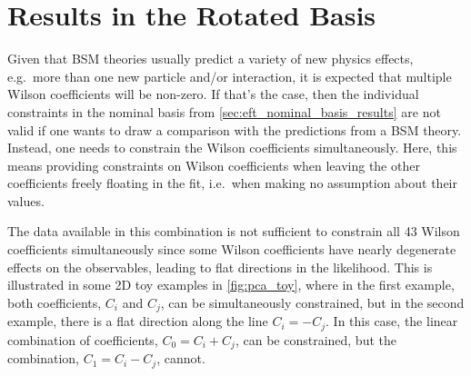 \section{Results in the Rotated Basis}\label{sec:eft_rotated_basis_results}

Given that BSM theories usually predict a variety of new physics effects, e.g.\ more than one new particle and/or interaction, it is expected that multiple Wilson coefficients will be non-zero. If that's the case, then the individual constraints in the nominal basis from \cref{sec:eft_nominal_basis_results} are not valid if one wants to draw a comparison with the predictions from a BSM theory. Instead, one needs to constrain the Wilson coefficients simultaneously. Here, this means providing constraints on Wilson coefficients when leaving the other coefficients freely floating in the fit, i.e.\ when making no assumption about their values. 

The data available in this combination is not sufficient to constrain all 43 Wilson coefficients simultaneously since some Wilson coefficients have nearly degenerate effects on the observables, leading to flat directions in the likelihood. This is illustrated in some 2D toy examples in \cref{fig:pca_toy}, where in the first example, both coefficients, $C_i$ and $C_j$, can be simultaneously constrained, but in the second example, there is a flat direction along the line $C_i = -C_j$. In this case, the linear combination of coefficients, $C_0 = C_i + C_j$, can be constrained, but the combination, $C_1 = C_i - C_j$, cannot. 

